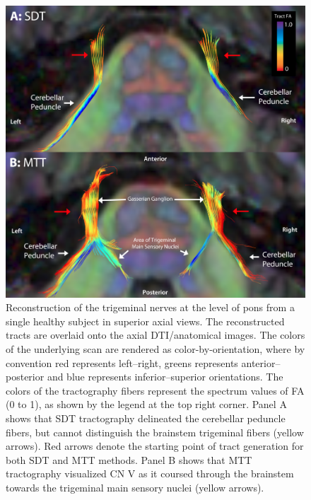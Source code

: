 \begin{figure}[p]
\includegraphics[width=\textwidth]{figure2.png}
\caption{Reconstruction of the trigeminal nerves at the level of pons from a single healthy subject in superior axial views. The reconstructed tracts are overlaid onto the axial DTI/anatomical images. The colors of the underlying scan are rendered as color-by-orientation, where by convention red represents left–right, greens represents anterior–posterior and blue represents inferior–superior orientations. The colors of the tractography fibers represent the spectrum values of FA (0 to 1), as shown by the legend at the top right corner. Panel A shows that SDT tractography delineated the cerebellar peduncle fibers, but cannot distinguish the brainstem trigeminal fibers (yellow arrows). Red arrows denote the starting point of tract generation for both SDT and MTT methods. Panel B shows that MTT tractography visualized CN V as it coursed through the brainstem towards the trigeminal main sensory nuclei (yellow arrows).}
\centering
\label{fig:MSfigure2}
\end{figure}


